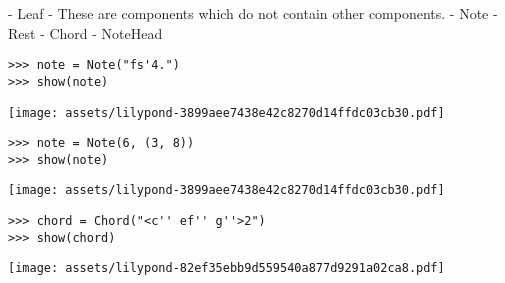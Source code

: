 \begin{markdown}
-   Leaf
-   These are components which do not contain other components.
-   Note
-   Rest
-   Chord
-   NoteHead
\end{markdown}

\begin{comment}
<abjad>
note = Note("fs'4.")
show(note)
</abjad>
\end{comment}

\begin{abjadbookoutput}
\begin{singlespacing}
\vspace{-0.5\baselineskip}
\begin{lstlisting}
>>> note = Note("fs'4.")
>>> show(note)
\end{lstlisting}
\noindent\texttt{[image: assets/lilypond-3899aee7438e42c8270d14ffdc03cb30.pdf]}
\end{singlespacing}
\end{abjadbookoutput}

\begin{comment}
<abjad>
note = Note(6, (3, 8))
show(note)
</abjad>
\end{comment}

\begin{abjadbookoutput}
\begin{singlespacing}
\vspace{-0.5\baselineskip}
\begin{lstlisting}
>>> note = Note(6, (3, 8))
>>> show(note)
\end{lstlisting}
\noindent\texttt{[image: assets/lilypond-3899aee7438e42c8270d14ffdc03cb30.pdf]}
\end{singlespacing}
\end{abjadbookoutput}

\begin{comment}
<abjad>
chord = Chord("<c'' ef'' g''>2")
show(chord)
</abjad>
\end{comment}

\begin{abjadbookoutput}
\begin{singlespacing}
\vspace{-0.5\baselineskip}
\begin{lstlisting}
>>> chord = Chord("<c'' ef'' g''>2")
>>> show(chord)
\end{lstlisting}
\noindent\texttt{[image: assets/lilypond-82ef35ebb9d559540a877d9291a02ca8.pdf]}
\end{singlespacing}
\end{abjadbookoutput}

